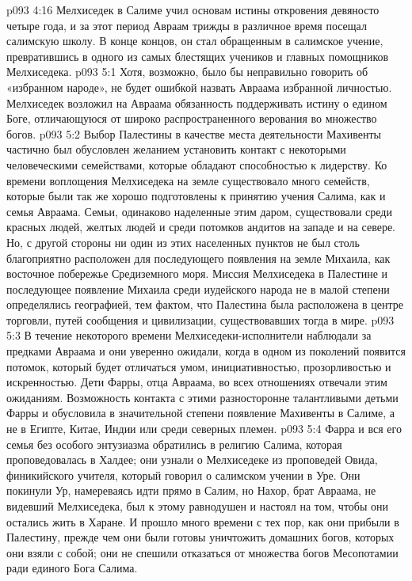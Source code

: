 \vs p093 4:16 \pc Мелхиседек в Салиме учил основам истины откровения девяносто четыре года, и за этот период Авраам трижды в различное время посещал салимскую школу. В конце концов, он стал обращенным в салимское учение, превратившись в одного из самых блестящих учеников и главных помощников Мелхиседека.
\vs p093 5:1 Хотя, возможно, было бы неправильно говорить об «избранном народе», не будет ошибкой назвать Авраама избранной личностью. Мелхиседек возложил на Авраама обязанность поддерживать истину о едином Боге, отличающуюся от широко распространенного верования во множество богов.
\vs p093 5:2 Выбор Палестины в качестве места деятельности Махивенты частично был обусловлен желанием установить контакт с некоторыми человеческими семействами, которые обладают способностью к лидерству. Ко времени воплощения Мелхиседека на земле существовало много семейств, которые были так же хорошо подготовлены к принятию учения Салима, как и семья Авраама. Семьи, одинаково наделенные этим даром, существовали среди красных людей, желтых людей и среди потомков андитов на западе и на севере. Но, с другой стороны ни один из этих населенных пунктов не был столь благоприятно расположен для последующего появления на земле Михаила, как восточное побережье Средиземного моря. Миссия Мелхиседека в Палестине и последующее появление Михаила среди иудейского народа не в малой степени определялись географией, тем фактом, что Палестина была расположена в центре торговли, путей сообщения и цивилизации, существовавших тогда в мире.
\vs p093 5:3 В течение некоторого времени Мелхиседеки\hyp{}исполнители наблюдали за предками Авраама и они уверенно ожидали, когда в одном из поколений появится потомок, который будет отличаться умом, инициативностью, прозорливостью и искренностью. Дети Фарры, отца Авраама, во всех отношениях отвечали этим ожиданиям. Возможность контакта с этими разносторонне талантливыми детьми Фарры и обусловила в значительной степени появление Махивенты в Салиме, а не в Египте, Китае, Индии или среди северных племен.
\vs p093 5:4 Фарра и вся его семья без особого энтузиазма обратились в религию Салима, которая проповедовалась в Халдее; они узнали о Мелхиседеке из проповедей Овида, финикийского учителя, который говорил о салимском учении в Уре. Они покинули Ур, намереваясь идти прямо в Салим, но Нахор, брат Авраама, не видевший Мелхиседека, был к этому равнодушен и настоял на том, чтобы они остались жить в Харане. И прошло много времени с тех пор, как они прибыли в Палестину, прежде чем они были готовы уничтожить  домашних богов, которых они взяли с собой; они не спешили отказаться от множества богов Месопотамии ради единого Бога Салима.
